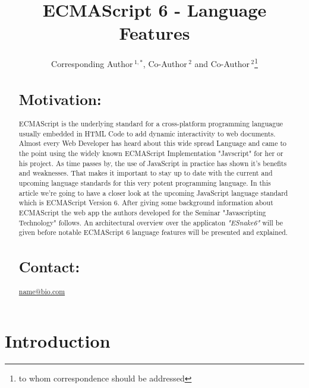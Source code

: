 \documentclass{bioinfo}
\begin{document}

\title[short Title]{ECMAScript 6 - Language Features}
\author[Sample \textit{et~al}]{Corresponding Author\,$^{1,*}$, Co-Author\,$^{2}$ and Co-Author\,$^2$\footnote{to whom correspondence should be addressed}}
\address{$^{1}$Department of XXXXXXX, Address XXXX etc.\\
$^{2}$Department of XXXXXXXX, Address XXXX etc.}



\maketitle

\begin{abstract}

\section{Motivation:}
ECMAScript is the underlying standard for a cross-platform programming languague usually embedded in HTML Code to add dynamic interactivity to web documents. 
Almost every Web Developer has heard about this wide spread Language and came to the point using the widely known ECMAScript Implementation "Javscript" for her or his project. 
As time passes by, the use of JavaScript in practice has shown it's benefits and weaknesses.
That makes it important to stay up to date with the current and upcoming language standards for this very potent programming language.  
In this article we're going to have a closer look at the upcoming JavaScript language standard which is ECMAScript Version 6.
After giving some background information about ECMAScript the web app the authors developed for the Seminar "Javascripting Technology" follows. 
An architectural overview over the applicaton \textit{"ESnake6"} will be given before notable ECMAScript 6 language features will be presented
and explained. 

\section{Contact:} \href{name@bio.com}{name@bio.com}
\end{abstract}
\section{Introduction}
\end{document}

